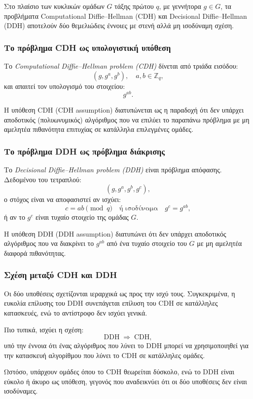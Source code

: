 \documentclass[12pt,a4paper]{report}
\begin{document}
Στο πλαίσιο των κυκλικών ομάδων $G$ τάξης πρώτου $q$, με γεννήτορα $g \in G$, τα προβλήματα Computational Diffie--Hellman (CDH) και Decisional Diffie--Hellman (DDH) αποτελούν δύο θεμελιώδεις έννοιες με στενή αλλά μη ισοδύναμη σχέση.

\subsubsection*{Το πρόβλημα CDH ως υπολογιστική υπόθεση}

Το \textit{Computational Diffie--Hellman problem (CDH)} δίνεται από τριάδα εισόδου:
\[
(g, g^a, g^b), \quad a,b \in \mathbb{Z}_q,
\]
και απαιτεί τον υπολογισμό του στοιχείου:
\[
g^{ab}.
\]

Η υπόθεση CDH (CDH assumption) διατυπώνεται ως η παραδοχή ότι δεν υπάρχει αποδοτικός (πολυωνυμικός) αλγόριθμος που να επιλύει το παραπάνω πρόβλημα με μη αμελητέα πιθανότητα επιτυχίας σε κατάλληλα επιλεγμένες ομάδες.

\subsubsection*{Το πρόβλημα DDH ως πρόβλημα διάκρισης}

Το \textit{Decisional Diffie--Hellman problem (DDH)} είναι πρόβλημα απόφασης. Δεδομένου του τετραπλού:
\[
(g, g^a, g^b, g^c),
\]
ο στόχος είναι να αποφασιστεί αν ισχύει:
\[
c = ab \pmod{q}
\quad \text{ή ισοδύναμα} \quad
g^c = g^{ab},
\]
ή αν το $g^c$ είναι τυχαίο στοιχείο της ομάδας $G$.

Η υπόθεση DDH (DDH assumption) διατυπώνει ότι δεν υπάρχει αποδοτικός αλγόριθμος που να διακρίνει το $g^{ab}$ από ένα τυχαίο στοιχείο του $G$ με μη αμελητέα διαφορά πιθανότητας.

\subsubsection*{Σχέση μεταξύ CDH και DDH}

Οι δύο υποθέσεις σχετίζονται ιεραρχικά ως προς την ισχύ τους. Συγκεκριμένα, η ευκολία επίλυσης του DDH συνεπάγεται επίλυση του CDH σε κατάλληλες κατασκευές, ενώ το αντίστροφο δεν ισχύει γενικά.

Πιο τυπικά, ισχύει η σχέση:
\[
\text{DDH} \;\Rightarrow\; \text{CDH},
\]
υπό την έννοια ότι ένας αλγόριθμος που λύνει το DDH μπορεί να χρησιμοποιηθεί για την κατασκευή αλγορίθμου που λύνει το CDH σε κατάλληλες ομάδες.

Ωστόσο, υπάρχουν ομάδες όπου το CDH θεωρείται δύσκολο, ενώ το DDH είναι εύκολο ή άκυρο ως υπόθεση, γεγονός που αναδεικνύει ότι οι δύο υποθέσεις δεν είναι ισοδύναμες.
\end{document}
